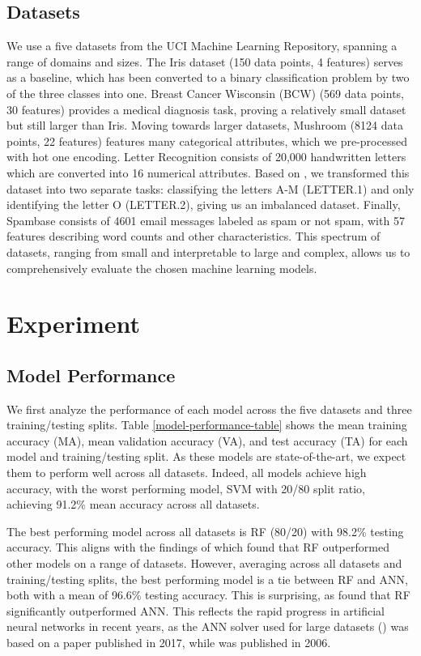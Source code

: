 \documentclass{article}
\begin{document}
\subsection{Datasets}
We use a five datasets from the UCI Machine Learning Repository, spanning a
range of domains and sizes. The Iris dataset (150 data points, 4 features)
serves as a baseline, which has been converted to a binary classification
problem by two of the three classes into one. Breast Cancer Wisconsin (BCW)
(569 data points, 30 features) provides a medical diagnosis task, proving a
relatively small dataset but still larger than Iris. Moving towards larger
datasets, Mushroom (8124 data points, 22 features) features many categorical
attributes, which we pre-processed with hot one encoding. Letter Recognition
consists of 20,000 handwritten letters which are converted into 16 numerical
attributes. Based on \citet{empirical-comparison}, we transformed this dataset
into two separate tasks: classifying the letters A-M (LETTER.1) and only
identifying the letter O (LETTER.2), giving us an imbalanced dataset. Finally,
Spambase consists of 4601 email messages labeled as spam or not spam, with 57
features describing word counts and other characteristics. This spectrum of
datasets, ranging from small and interpretable to large and complex, allows us
to comprehensively evaluate the chosen machine learning models.

\section{Experiment}

\subsection{Model Performance}

We first analyze the performance of each model across the five datasets and
three training/testing splits. Table \ref{model-performance-table} shows the
mean training accuracy (MA), mean validation accuracy (VA), and test accuracy
(TA) for each model and training/testing split. As these models are
state-of-the-art, we expect them to perform well across all datasets. Indeed,
all models achieve high accuracy, with the worst performing model, SVM with
20/80 split ratio, achieving 91.2\% mean accuracy across all datasets.

The best performing model across all datasets is RF (80/20) with 98.2\% testing
accuracy. This aligns with the findings of \citet{empirical-comparison} which
found that RF outperformed other models on a range of datasets. However,
averaging across all datasets and training/testing splits, the best performing
model is a tie between RF and ANN, both with a mean of 96.6\% testing accuracy.
This is surprising, as \citet{empirical-comparison} found that RF significantly
outperformed ANN. This reflects the rapid progress in artificial neural
networks in recent years, as the ANN solver used for large datasets
(\citet{adam}) was based on a paper published in 2017, while
\citet{empirical-comparison} was published in 2006.
\end{document}
